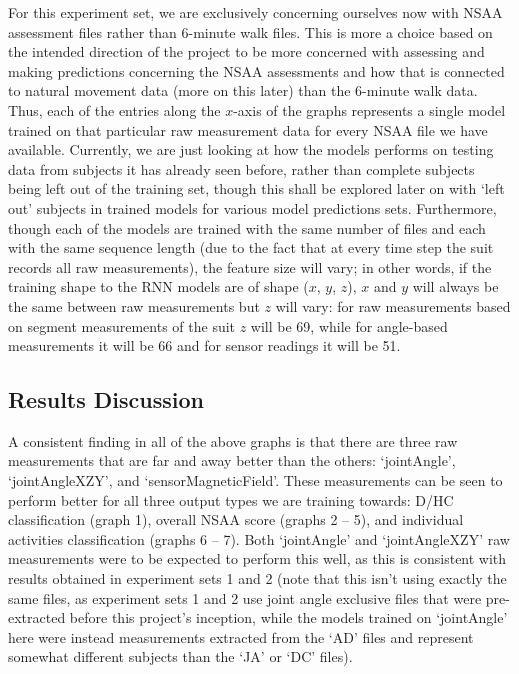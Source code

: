 \documentclass[12pt,twoside]{report}
\begin{document}
\quad For this experiment set, we are exclusively concerning ourselves now with NSAA assessment files rather than 6-minute walk files. This is more a choice based on the intended direction of the project to be more concerned with assessing and making predictions concerning the NSAA assessments and how that is connected to natural movement data (more on this later) than the 6-minute walk data. Thus, each of the entries along the $x$-axis of the graphs represents a single model trained on that particular raw measurement data for every NSAA file we have available. Currently, we are just looking at how the models performs on testing data from subjects it has already seen before, rather than complete subjects being left out of the training set, though this shall be explored later on with ‘left out’ subjects in trained models for various model predictions sets. Furthermore, though each of the models are trained with the same number of files and each with the same sequence length (due to the fact that at every time step the suit records all raw measurements), the feature size will vary; in other words, if the training shape to the RNN models are of shape ($x$, $y$, $z$), $x$ and $y$ will always be the same between raw measurements but $z$ will vary: for raw measurements based on segment measurements of the suit $z$ will be 69, while for angle-based measurements it will be 66 and for sensor readings it will be 51.


\subsection{Results Discussion}

\quad A consistent finding in all of the above graphs is that there are three raw measurements that are far and away better than the others: ‘jointAngle’, ‘jointAngleXZY’, and ‘sensorMagneticField’. These measurements can be seen to perform better for all three output types we are training towards: D/HC classification (graph 1), overall NSAA score (graphs 2 – 5), and individual activities classification (graphs 6 – 7). Both ‘jointAngle’ and ‘jointAngleXZY’ raw measurements were to be expected to perform this well, as this is consistent with results obtained in experiment sets 1 and 2 (note that this isn’t using exactly the same files, as experiment sets 1 and 2 use joint angle exclusive files that were pre-extracted before this project’s inception, while the models trained on ‘jointAngle’ here were instead measurements extracted from the ‘AD’ files and represent somewhat different subjects than the ‘JA’ or ‘DC’ files).\\
\end{document}
